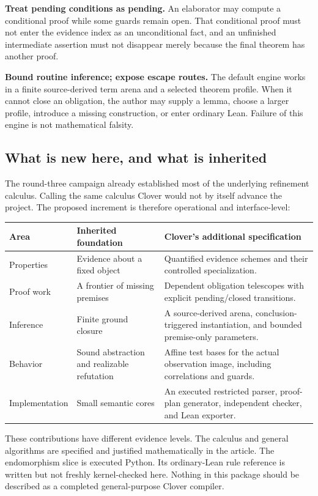\documentclass[11pt,a4paper]{article}
\theoremstyle{definition}
\theoremstyle{remark}
\begin{document}
\textbf{Treat pending conditions as pending.} An elaborator may compute a
conditional proof while some guards remain open. That conditional proof must
not enter the evidence index as an unconditional fact, and an unfinished
intermediate assertion must not disappear merely because the final theorem
has another proof.

\textbf{Bound routine inference; expose escape routes.} The default engine
works in a finite source-derived term arena and a selected theorem profile.
When it cannot close an obligation, the author may supply a lemma, choose a
larger profile, introduce a missing construction, or enter ordinary Lean.
Failure of this engine is not mathematical falsity.

\subsection{What is new here, and what is inherited}

The round-three campaign already established most of the underlying refinement
calculus. Calling the same calculus Clover would not by itself advance the
project. The proposed increment is therefore operational and interface-level:

\begin{center}\small
\begin{tabularx}{\textwidth}{@{}P{.25\textwidth}Y Y@{}}
\toprule
Area & Inherited foundation & Clover's additional specification\\\midrule
Properties & Evidence about a fixed object & Quantified evidence schemes and their controlled specialization.\\
Proof work & A frontier of missing premises & Dependent obligation telescopes with explicit pending/closed transitions.\\
Inference & Finite ground closure & A source-derived arena, conclusion-triggered instantiation, and bounded premise-only parameters.\\
Behavior & Sound abstraction and realizable refutation & Affine test bases for the actual observation image, including correlations and guards.\\
Implementation & Small semantic cores & An executed restricted parser, proof-plan generator, independent checker, and Lean exporter.\\
\bottomrule
\end{tabularx}
\end{center}

These contributions have different evidence levels. The calculus and general
algorithms are specified and justified mathematically in the article. The
endomorphism slice is executed Python. Its ordinary-Lean rule reference is
written but not freshly kernel-checked here. Nothing in this package should
be described as a completed general-purpose Clover compiler.
\end{document}
